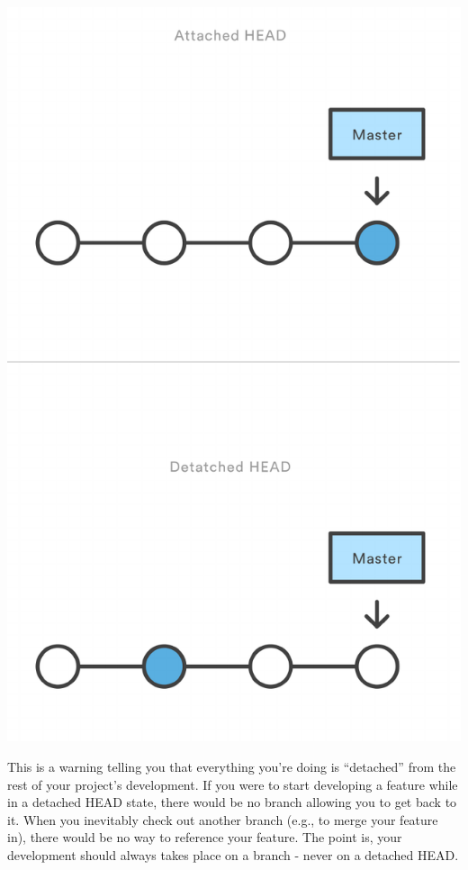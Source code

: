 \documentclass{article}
\begin{document}
\begin{center}
\includegraphics[scale=0.5]{figures/09.pdf}
\end{center}

This is a warning telling you that everything you're doing is
``detached'' from the rest of your project's development. If you were to
start developing a feature while in a detached HEAD state, there would
be no branch allowing you to get back to it. When you inevitably check
out another branch (e.g., to merge your feature in), there would be no
way to reference your feature. The point is, your development should
always takes place on a branch - never on a detached HEAD. 
\end{document}
